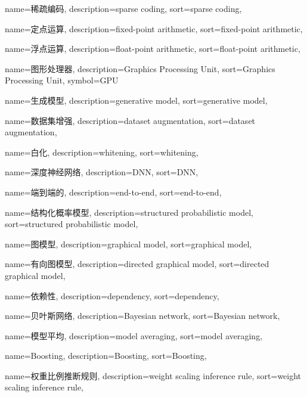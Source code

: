 {
  name=稀疏编码,
  description={sparse coding},
  sort={sparse coding},
}

{
  name=定点运算,
  description={fixed-point arithmetic},
  sort={fixed-point arithmetic},
}

{
  name=浮点运算,
  description={float-point arithmetic},
  sort={float-point arithmetic},
}

{
  name=图形处理器,
  description={Graphics Processing Unit},
  sort={Graphics Processing Unit},
  symbol={GPU}
}

{
  name=生成模型,
  description={generative model},
  sort={generative model},
}

{
  name=数据集增强,
  description={dataset augmentation},
  sort={dataset augmentation},
}

{
  name=白化,
  description={whitening},
  sort={whitening},
}

{
  name=深度神经网络,
  description={DNN},
  sort={DNN},
}

{
  name=端到端的,
  description={end-to-end},
  sort={end-to-end},
}

{
  name=结构化概率模型,
  description={structured probabilistic model},
  sort={structured probabilistic model},
}

{
  name=图模型,
  description={graphical model},
  sort={graphical model},
}

{
  name=有向图模型,
  description={directed graphical model},
  sort={directed graphical model},
}

{
  name=依赖性,
  description={dependency},
  sort={dependency},
}

{
  name=贝叶斯网络,
  description={Bayesian network},
  sort={Bayesian network},
}

{
  name=模型平均,
  description={model averaging},
  sort={model averaging},
}

{
  name=Boosting,
  description={Boosting},
  sort={Boosting},
}

{
  name=权重比例推断规则,
  description={weight scaling inference rule},
  sort={weight scaling inference rule},
}

